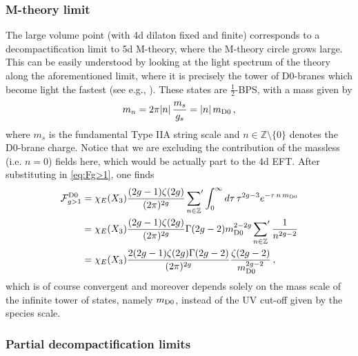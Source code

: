 \subsubsection*{M-theory limit}

The large volume point (with 4d dilaton fixed and finite) corresponds to a decompactification limit to 5d M-theory, where the M-theory circle grows large. This can be easily understood by looking at the light spectrum of the theory along the aforementioned limit, where it is precisely the tower of D0-branes which become light the fastest (see e.g., \cite{Font:2019cxq}). These states are $\frac12$-BPS, with a mass given by
%
\begin{equation}
\label{eq:D0mass}
	m_n = 2\pi |n|\, \frac{m_s}{g_s} = |n|\, m_{\rm D0}\, ,
\end{equation}
%
where $m_s$ is the fundamental Type IIA string scale and $n\in \mathbb{Z} \setminus \{ 0\}$ denotes the D0-brane charge. Notice that we are excluding the contribution of the massless (i.e. $n=0$) fields here, which would be actually part to the 4d EFT. After substituting in \eqref{eq:Fg>1}, one finds
%
\begin{align}
\label{eq:Fg>1D0}
	\mathcal{F}^{\rm D0}_{g>1}&= \chi_E(X_3) \frac{(2g-1) \zeta(2g)}{(2\pi)^{2g}} \sideset{}{'}\sum_{n \in \mathbb{Z}}\int_0^{\infty}d\tau\, \tau^{2g-3}e^{-\tau\, n\,  m_{\rm D0}} \notag\\
    &=\chi_E(X_3) \frac{(2g-1) \zeta(2g)}{(2\pi)^{2g}} \Gamma(2g-2)  m_{\rm D0}^{2-2g} \sideset{}{'}\sum_{n \in \mathbb{Z}} \frac{1}{n^{2g-2}} \notag\\
    &= \chi_E(X_3)\frac{2(2g-1) \zeta(2g) \Gamma(2g-2)}{(2\pi)^{2g}} \frac{\zeta(2g-2)}{m_{\rm D0}^{2g-2}}\, ,
\end{align}
%
which is of course convergent and moreover depends solely on the mass scale of the infinite tower of states, namely $m_{\rm D0}$, instead of the UV cut-off given by the species scale.

\subsubsection*{Partial decompactification limits}

